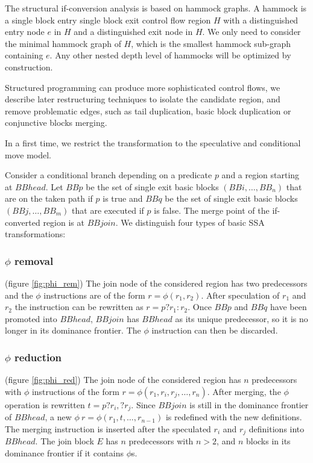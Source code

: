 The structural if-conversion analysis is based on hammock graphs. A hammock is a single block entry single block exit control flow region $H$ with a distinguished entry node $e$ in $H$ and a distinguished exit node in $H$. We only need to consider the minimal hammock graph of $H$, which is the smallest hammock sub-graph containing $e$. Any other nested depth level of hammocks will be optimized by construction.

Structured programming can produce more sophisticated control flows, we describe later restructuring techniques to isolate the candidate region, and remove problematic edges, such as tail duplication, basic block duplication or conjunctive blocks merging. 

In a first time, we restrict the transformation to the speculative and conditional move model.

Consider a conditional branch depending on a predicate $p$ and a region starting at $BBhead$. Let $BBp$ be the set of single exit basic blocks $(BBi,\dots,BB_n)$ that are on the taken path if $p$ is true and $BBq$ be the set of single exit basic blocks $(BBj,\dots,BB_m)$ that are executed if $p$ is false. The merge point of the if-converted region is at $BBjoin$. We distinguish four types of basic SSA transformations:

\subsubsection{$\phi$ removal} (figure \ref{fig:phi_rem})
The join node of the considered region has two predecessors and the $\phi$ instructions are of the form $r=\phi(r_1,r_2)$. After speculation of $r_1$ and $r_2$ the instruction can be rewritten as $r=p?r_1:r_2$.
Once $BBp$ and $BBq$ have been promoted into $BBhead$, $BBjoin$ has $BBhead$ as its unique predecessor, so it is no longer in its dominance frontier. The $\phi$ instruction can then be discarded.

\subsubsection{$\phi$ reduction} (figure \ref{fig:phi_red})
 The join node of the considered region has $n$ predecessors with $\phi$ instructions of the form $r=\phi(r_1,r_i,r_j,\dots,r_n)$. After merging, the $\phi$ operation is rewritten $t=p?r_i,?r_j$. Since $BBjoin$ is still in the dominance frontier of $BBhead$, a new $\phi\:r=\phi(r_1,t,\dots,r_{n-1})$ is redefined with the new definitions. The merging instruction is inserted after the speculated $r_i$ and $r_j$ definitions into $BBhead$.
The join block $E$ has $n$ predecessors with $n > 2$, and $n$ blocks in its dominance frontier if it contains $\phi$s.

